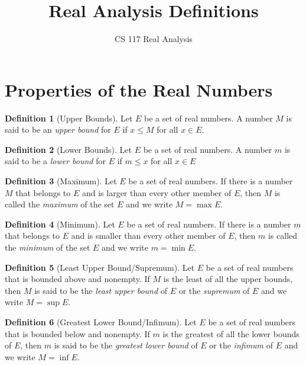 \documentclass[11pt]{article}
\title{Real Analysis Definitions}
\author{CS 117 Real Analysis}
\theoremstyle{definition}
\newtheorem{definition}{Definition}[section]
\begin{document}
\maketitle

\section{Properties of the Real Numbers}
\begin{definition}[Upper Bounds]
	Let $E$ be a set of real numbers. A number $ M $ is said to be an \textit{upper bound} for $ E $ if $ x \leq M $ for all $ x \in E $.
\end{definition}


\begin{definition} [Lower Bounds]
	Let $ E $ be a set of real numbers. A number $ m $ is said to be a \textit{lower bound} for $ E $ if $ m \leq x $ for all $ x \in E $
\end{definition}


\begin{definition} [Maximum]
	Let $ E $ be a set of real numbers. If there is a number $ M $ that belongs to $ E $ and is larger than every other member of $ E $, then $ M $ is called the \textit{maximum} of the set $ E $ and we write $ M = \max E $.
\end{definition}


\begin{definition} [Minimum]
	Let $ E $ be a set of real numbers. If there is a number $ m $ that belongs to $ E $ and is smaller than every other member of $ E $, then $ m $ is called the \textit{minimum} of the set $ E $ and we write $ m = \min E $.
\end{definition}


\setcounter{definition}{8}
\begin{definition} [Least Upper Bound/Supremum]
	Let $ E $ be a set of real numbers that is bounded above and nonempty. If $ M $ is the least of all the upper bounds, then $ M $ is said to be the \textit{least upper bound} of $ E $ or the \textit{supremum} of $ E $ and we write $ M = \sup E $.
\end{definition}


\begin{definition} [Greatest Lower Bound/Infimum]
	Let $ E $ be a set of real numbers that is bounded below and nonempty. If $ m $ is the greatest of all the lower bounds of $ E $, then $ m $ is said to be the \textit{greatest lower bound} of $ E $ or the \textit{infimum} of $ E $ and we write $ M = \inf E $.
\end{definition}
\end{document}
